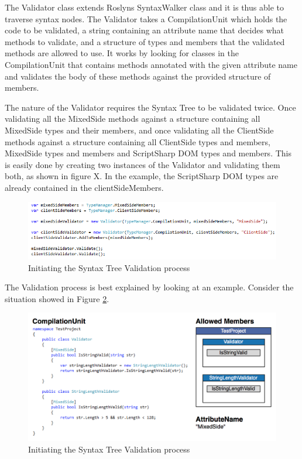 		The Validator class extends Roslyns SyntaxWalker class and it is thus able to traverse syntax nodes. The Validator takes a CompilationUnit which holds the code to be validated, a string containing an attribute name that decides what methods to validate, and a structure of types and members that the validated methods are allowed to use. It works by looking for classes in the CompilationUnit that contains methods annotated with the given attribute name and validates the body of these methods against the provided structure of members.

		The nature of the Validator requires the Syntax Tree to be validated twice. Once validating all the MixedSide methods against a structure containing all MixedSide types and their members, and once validating all the ClientSide methods against a structure containing all ClientSide types and members, MixedSide types and members and ScriptSharp DOM types and members. This is easily done by creating two instances of the Validator and validating them both, as shown in figure X. In the example, the ScriptSharp DOM types are already contained in the clientSideMembers. 

		\begin{figure}[H]
			\begin{center}
				\centerline{\includegraphics[width=14cm]{resources/images/validatorInitiation.png}}
			\end{center}
			\caption{Initiating the Syntax Tree Validation process}
			\label{validatorInitiation}
		\end{figure}

		The Validation process is best explained by looking at an example. Consider the situation showed in Figure \ref{fig:mixedSideValidationExample}. 

		\begin{figure}[H]
			\begin{center}
				\centerline{\includegraphics[width=14cm]{resources/images/MixedSideValidationExample.png}}
			\end{center}
			\caption{Initiating the Syntax Tree Validation process}
			\label{fig:mixedSideValidationExample}
		\end{figure}		
		
